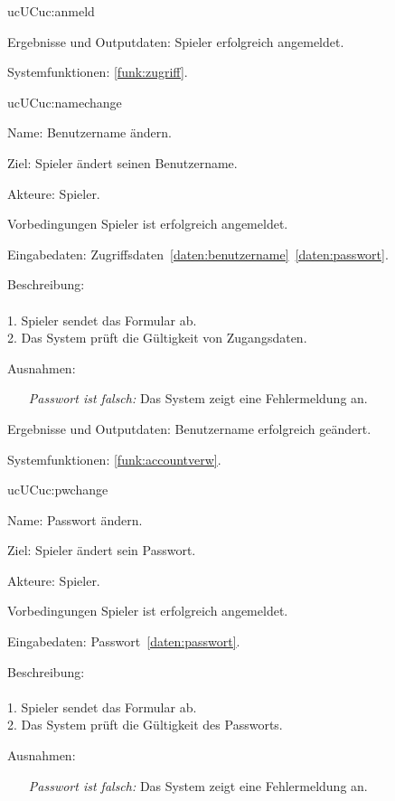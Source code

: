 \begin{description}[leftmargin=5em, style=sameline]
\begin{lhp}{uc}{UC}{uc:anmeld}
\begin{itemize}
		    \end{itemize}
		\item [Ergebnisse und Outputdaten:] Spieler erfolgreich angemeldet.	
		\item [Systemfunktionen:] \ref{funk:zugriff}.
	\end{lhp}
	
	\begin{lhp}{uc}{UC}{uc:namechange}
		\item [Name:] Benutzername ändern.
		\item [Ziel:] Spieler ändert seinen Benutzername.
		\item [Akteure:] Spieler.
		\item [Vorbedingungen] Spieler ist erfolgreich angemeldet.
		\item [Eingabedaten:] Zugriffsdaten~\ref{daten:benutzername}~\ref{daten:passwort}.
		\item [Beschreibung:] \hfill\\ \hfill\\
			1. Spieler sendet das Formular ab.\\
			2. Das System prüft die Gültigkeit von Zugangsdaten.\\				
		\item [Ausnahmen:]\hfill 
	    	\begin{itemize} 
			    \item[] \textit{Passwort ist falsch:} Das System zeigt eine Fehlermeldung an.					
			
		    \end{itemize}
		\item [Ergebnisse und Outputdaten:] Benutzername erfolgreich geändert.	
		\item [Systemfunktionen:] \ref{funk:accountverw}.
	\end{lhp}	
	
	\begin{lhp}{uc}{UC}{uc:pwchange}
		\item [Name:] Passwort ändern.
		\item [Ziel:] Spieler ändert sein Passwort.
		\item [Akteure:] Spieler.
		\item [Vorbedingungen] Spieler ist erfolgreich angemeldet.
		\item [Eingabedaten:] Passwort~\ref{daten:passwort}.
		\item [Beschreibung:] \hfill\\ \hfill\\
			1. Spieler sendet das Formular ab.\\
			2. Das System prüft die Gültigkeit des Passworts.\\				
		\item [Ausnahmen:]\hfill 
	    	\begin{itemize} 
			    \item[] \textit{Passwort ist falsch:} Das System zeigt eine Fehlermeldung an.					
			

\end{itemize}
\end{lhp}
\end{description}
